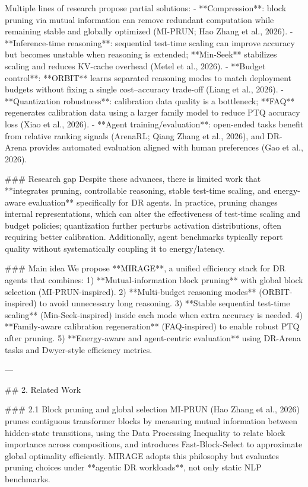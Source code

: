 Multiple lines of research propose partial solutions:
- **Compression**: block pruning via mutual information can remove redundant computation while remaining stable and globally optimized (MI-PRUN; Hao Zhang et al., 2026).  
- **Inference-time reasoning**: sequential test-time scaling can improve accuracy but becomes unstable when reasoning is extended; **Min-Seek** stabilizes scaling and reduces KV-cache overhead (Metel et al., 2026).  
- **Budget control**: **ORBIT** learns separated reasoning modes to match deployment budgets without fixing a single cost–accuracy trade-off (Liang et al., 2026).  
- **Quantization robustness**: calibration data quality is a bottleneck; **FAQ** regenerates calibration data using a larger family model to reduce PTQ accuracy loss (Xiao et al., 2026).  
- **Agent training/evaluation**: open-ended tasks benefit from relative ranking signals (ArenaRL; Qiang Zhang et al., 2026), and DR-Arena provides automated evaluation aligned with human preferences (Gao et al., 2026).  

### Research gap  
Despite these advances, there is limited work that **integrates pruning, controllable reasoning, stable test-time scaling, and energy-aware evaluation** specifically for DR agents. In practice, pruning changes internal representations, which can alter the effectiveness of test-time scaling and budget policies; quantization further perturbs activation distributions, often requiring better calibration. Additionally, agent benchmarks typically report quality without systematically coupling it to energy/latency.

### Main idea  
We propose **MIRAGE**, a unified efficiency stack for DR agents that combines:
1) **Mutual-information block pruning** with global block selection (MI-PRUN-inspired).  
2) **Multi-budget reasoning modes** (ORBIT-inspired) to avoid unnecessary long reasoning.  
3) **Stable sequential test-time scaling** (Min-Seek-inspired) inside each mode when extra accuracy is needed.  
4) **Family-aware calibration regeneration** (FAQ-inspired) to enable robust PTQ after pruning.  
5) **Energy-aware and agent-centric evaluation** using DR-Arena tasks and Dwyer-style efficiency metrics.

---

## 2. Related Work  

### 2.1 Block pruning and global selection  
MI-PRUN (Hao Zhang et al., 2026) prunes contiguous transformer blocks by measuring mutual information between hidden-state transitions, using the Data Processing Inequality to relate block importance across compositions, and introduces Fast-Block-Select to approximate global optimality efficiently. MIRAGE adopts this philosophy but evaluates pruning choices under **agentic DR workloads**, not only static NLP benchmarks.

